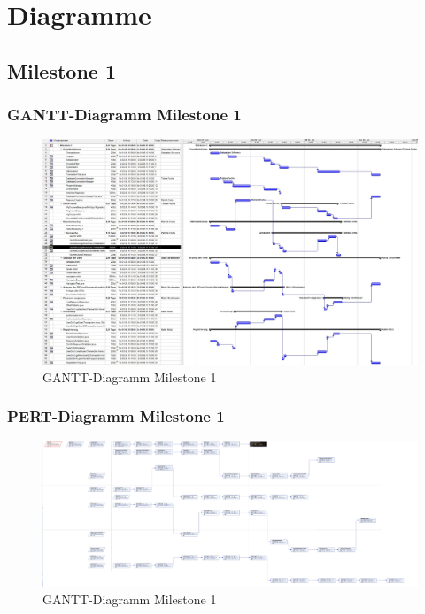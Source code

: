 \chapter{Diagramme}

\section{Milestone 1}
\subsection{GANTT-Diagramm Milestone 1}
 \begin{figure}[h]
 		\centering
 		\includegraphics[width=1\linewidth, angle=90]{Grafiken/Milestone1Gantt}
 		\caption{GANTT-Diagramm Milestone 1}
 		\label{fig:GANTT-Diagramm Milestone 1}
 \end{figure}



\subsection{PERT-Diagramm Milestone 1}
\begin{figure}[h]
	\centering
	\includegraphics[width=1\linewidth, angle=90]{Grafiken/Milestone1Pert}
	\caption{GANTT-Diagramm Milestone 1}
	\label{fig:PERT-Diagramm Milestone 1}
\end{figure}

